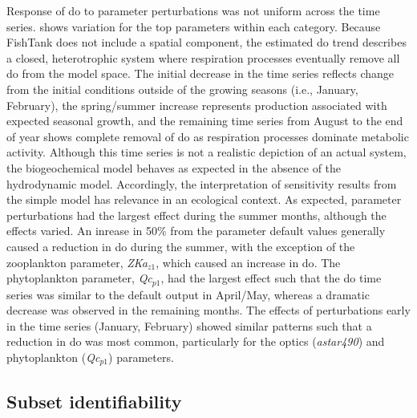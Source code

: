 \documentclass[letterpaper,12pt,oneside]{article}\usepackage[]{graphicx}\usepackage[]{color}
\begin{document}
Response of \ac{do} to parameter perturbations was not uniform across the time series.   shows variation for the top parameters within each category.  Because FishTank does not include a spatial component, the estimated \ac{do} trend describes a closed, heterotrophic system where respiration processes eventually remove all \ac{do} from the model space.  The initial decrease in the time series reflects change from the initial conditions outside of the growing seasons (i.e., January, February), the spring/summer increase represents production associated with expected seasonal growth, and the remaining time series from August to the end of year shows complete removal of \ac{do} as respiration processes dominate metabolic activity. Although this time series is not a realistic depiction of an actual system, the biogeochemical model behaves as expected in the absence of the hydrodynamic model.  Accordingly, the interpretation of sensitivity results from the simple model has relevance in an ecological context.  As expected, parameter perturbations had the largest effect during the summer months, although the effects varied.  An inrease in 50\% from the parameter default values generally caused a reduction in \ac{do} during the summer, with the exception of the zooplankton parameter, \textit{ZKa$_{z1}$}, which caused an increase in \ac{do}.  The phytoplankton parameter, \textit{Qc$_{p1}$}, had the largest effect such that the \ac{do} time series was similar to the default output in April/May, whereas a dramatic decrease was observed in the remaining months.  The effects of perturbations early in the time series (January, February) showed similar patterns such that a reduction in \ac{do} was most common, particularly for the optics (\textit{astar490}) and phytoplankton (\textit{Qc$_{p1}$}) parameters.

\subsection{Subset identifiability}
\end{document}
